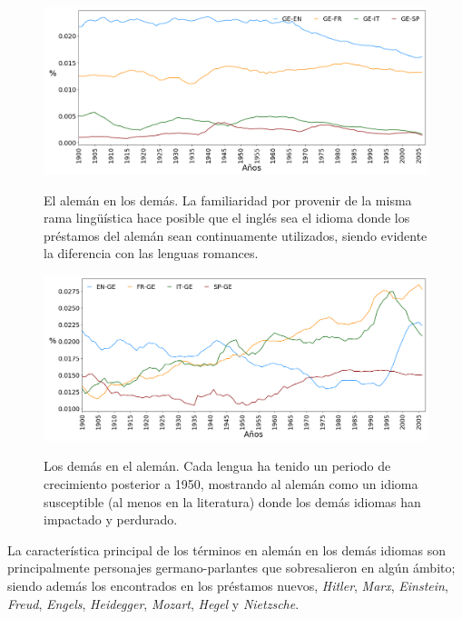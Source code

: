 \begin{figure}[h!]
	\centering
	\includegraphics[scale=.36]{Cap_4/PF1_S2_GE.png}
	\label{fig.ST_a_GE}
	\caption{El alemán en los demás. La familiaridad por provenir de la misma rama lingüística hace posible que el inglés sea el idioma  donde los préstamos del alemán sean continuamente utilizados, siendo evidente la diferencia con las lenguas romances.}

\end{figure}


\begin{figure}[h!]
	\centering
	\includegraphics[scale=.36]{Cap_4/PF2_S2_GE.png}
	\label{fig.ST_b_GE}
	\caption{Los demás en el alemán. Cada lengua ha tenido un periodo de  crecimiento posterior a 1950, mostrando al alemán como un idioma susceptible (al menos en la literatura) donde los demás idiomas han impactado y perdurado.}
\end{figure}


\clearpage


La característica principal de los términos en alemán  en los demás idiomas  son principalmente personajes germano-parlantes que sobresalieron en algún ámbito; siendo además los encontrados en los préstamos nuevos, \textit{Hitler}, \textit{Marx}, \textit{Einstein}, \textit{Freud}, \textit{Engels}, \textit{Heidegger}, \textit{Mozart}, \textit{Hegel} y  \textit{Nietzsche}. 


